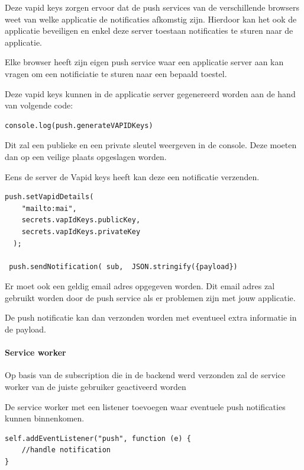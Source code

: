 			Deze vapid keys zorgen ervoor dat de push services van de verschillende browsers weet van welke applicatie de notificaties afkomstig zijn. Hierdoor kan het ook de applicatie beveiligen en enkel deze server toestaan notificaties te sturen naar de applicatie.
			
			Elke browser heeft zijn eigen push service waar een applicatie server aan kan vragen om een notificiatie te sturen naar een bepaald toestel.
			\autocite{Gaunt2020}
			
			Deze vapid keys kunnen in de applicatie server gegenereerd worden aan de hand van volgende code:
			
\begin{lstlisting}
console.log(push.generateVAPIDKeys)
\end{lstlisting}

			Dit zal een publieke en een private sleutel weergeven in de console. Deze moeten dan op een veilige plaats opgeslagen worden.
			
			Eens de server de Vapid keys heeft kan deze een notificatie verzenden.
			
\begin{lstlisting}
push.setVapidDetails(
    "mailto:mai",
    secrets.vapIdKeys.publicKey,
    secrets.vapIdKeys.privateKey
  );
  
 push.sendNotification( sub,  JSON.stringify({payload})
\end{lstlisting}

			Er moet ook een geldig email adres opgegeven worden. Dit email adres zal gebruikt worden door de push service als er problemen zijn met jouw applicatie.
			
			De push notificatie kan dan verzonden worden met eventueel extra informatie in de payload.
			
		\paragraph{Service worker}
		
			Op basis van de subscription die in de backend werd verzonden zal de service worker van de juiste gebruiker geactiveerd worden
			
			De service worker met een listener toevoegen waar eventuele push notificaties kunnen binnenkomen.
			
\begin{lstlisting}
self.addEventListener("push", function (e) {
	//handle notification
}
\end{lstlisting}
			
